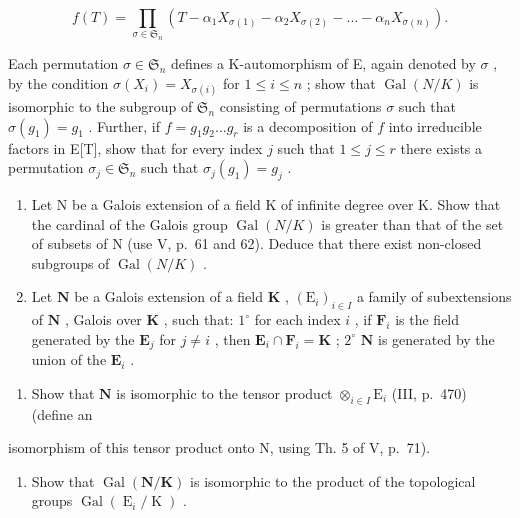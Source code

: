 \[
f (T) = \prod_ {\sigma \in \mathfrak {S} _ {n}} \left(T - \alpha_ {1} X _ {\sigma (1)} - \alpha_ {2} X _ {\sigma (2)} - \dots - \alpha_ {n} X _ {\sigma (n)}\right).
\]

Each permutation \(\sigma \in \mathfrak{S}_n\) defines a K-automorphism of E, again denoted by \(\sigma\) , by the condition \(\sigma(X_i) = X_{\sigma(i)}\) for \(1 \leqslant i \leqslant n\) ; show that \(\operatorname{Gal}(N/K)\) is isomorphic to the subgroup of \(\mathfrak{S}_n\) consisting of permutations \(\sigma\) such that \(\sigma(g_1) = g_1\) . Further, if \(f = g_1g_2 \ldots g_r\) is a decomposition of \(f\) into irreducible factors in E{[}T{]}, show that for every index \(j\) such that \(1 \leqslant j \leqslant r\) there exists a permutation \(\sigma_j \in \mathfrak{S}_n\) such that \(\sigma_j(g_1) = g_j\) .

\begin{enumerate}
\def\labelenumi{\arabic{enumi})}
\setcounter{enumi}{2}
\item
  Let N be a Galois extension of a field K of infinite degree over K. Show that the cardinal of the Galois group \(\operatorname{Gal}(N/K)\) is greater than that of the set of subsets of N (use V, p.~61 and 62). Deduce that there exist non-closed subgroups of \(\operatorname{Gal}(N/K)\) .
\item
  Let \(\mathbf{N}\) be a Galois extension of a field \(\mathbf{K}\) , \((\mathrm{E}_i)_{i\in I}\) a family of subextensions of \(\mathbf{N}\) , Galois over \(\mathbf{K}\) , such that: \(1^{\circ}\) for each index \(i\) , if \(\mathbf{F}_i\) is the field generated by the \(\mathbf{E}_j\) for \(j\neq i\) , then \(\mathbf{E}_i\cap \mathbf{F}_i = \mathbf{K}\) ; \(2^{\circ}\) \(\mathbf{N}\) is generated by the union of the \(\mathbf{E}_i\) .
\end{enumerate}

\begin{enumerate}
\def\labelenumi{\alph{enumi})}
\tightlist
\item
  Show that \(\mathbf{N}\) is isomorphic to the tensor product \(\otimes_{i\in I}\mathrm{E}_i\) (III, p.~470) (define an
\end{enumerate}

isomorphism of this tensor product onto N, using Th. 5 of V, p.~71).

\begin{enumerate}
\def\labelenumi{\alph{enumi})}
\setcounter{enumi}{1}
\tightlist
\item
  Show that \(\operatorname{Gal}(\mathbf{N}/\mathbf{K})\) is isomorphic to the product of the topological groups \(\operatorname{Gal}(\operatorname{E}_{i}/\operatorname{K})\) .
\end{enumerate}

